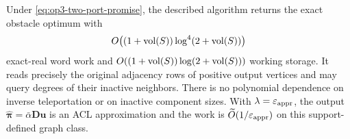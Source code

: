 \begin{theorem}
\label{thm:op3-two-port-frontier}
Under \cref{eq:op3-two-port-promise}, the described algorithm returns the
exact obstacle optimum with
\begin{equation}
 O\bigl((1+\operatorname{vol}(S))\log^4(2+\operatorname{vol}(S))\bigr)
 \label{eq:op3-two-port-work}
\end{equation}
exact-real word work and
$O((1+\operatorname{vol}(S))\log(2+\operatorname{vol}(S)))$ working storage. It reads precisely the
original adjacency rows of positive output vertices and may query degrees
of their inactive neighbors. There is no polynomial dependence on
inverse teleportation or on inactive component sizes. With
$\lambda=\varepsilon_{\mathrm{appr}}$, the output $\widehat{\bm\pi}=\bar\alpha\bm D\bm u$
is an ACL approximation and the work is
$\widetilde O(1/\varepsilon_{\mathrm{appr}})$ on this support-defined graph class.
\end{theorem}
